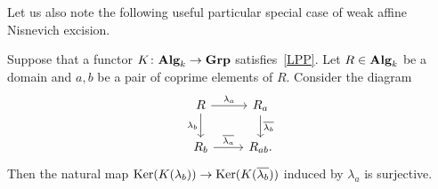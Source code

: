 \documentclass[oneside, 11pt]{amsart} \pdfoutput=1
\begin{document}
Let us also note the following useful particular special case of weak affine Nisnevich excision.
\begin{lemma}
	\label{zgl} Suppose that a functor $K\colon {\normalfont\textbf{Alg}}_k \to {\normalfont\textbf{Grp}}$ satisfies~\ref{LPP}. Let $R \in {\normalfont\textbf{Alg}}_k$ be a domain and $a, b$ be a pair of coprime elements of $R$. Consider the diagram
$$\begin{tikzcd}
	R \ar{r}{\lambda_a} \ar{d}[swap]{\lambda_b} & R_a \ar{d}{\overline{\lambda_b}}\\
	R_b \ar{r}{\overline{\lambda_a}} & R_{ab}.
\end{tikzcd}$$
	Then the natural map $\mathop{\mathrm{Ker}}\nolimits(K(\lambda_b)) \to \mathop{\mathrm{Ker}}\nolimits(K(\overline{\lambda_b}))$ induced by $\lambda_a$ is surjective.
\end{lemma}
%
\end{document}
